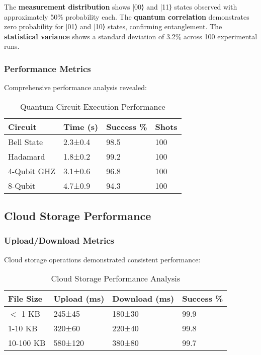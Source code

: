 \documentclass[onecolumn]{IEEEtran}
\begin{document}
The \textbf{measurement distribution} shows |00⟩ and |11⟩ states observed with approximately 50\% probability each. The \textbf{quantum correlation} demonstrates zero probability for |01⟩ and |10⟩ states, confirming entanglement. The \textbf{statistical variance} shows a standard deviation of 3.2\% across 100 experimental runs.

\subsubsection{Performance Metrics}

Comprehensive performance analysis revealed:

\begin{table}[h]
\centering
\caption{Quantum Circuit Execution Performance}
\footnotesize
\begin{tabular}{|p{1.8cm}|p{1.5cm}|p{1.5cm}|p{1cm}|}
\hline
\textbf{Circuit} & \textbf{Time (s)} & \textbf{Success \%} & \textbf{Shots} \\
\hline
Bell State & 2.3±0.4 & 98.5 & 100 \\
Hadamard & 1.8±0.2 & 99.2 & 100 \\
4-Qubit GHZ & 3.1±0.6 & 96.8 & 100 \\
8-Qubit & 4.7±0.9 & 94.3 & 100 \\
\hline
\end{tabular}
\end{table}

\subsection{Cloud Storage Performance}

\subsubsection{Upload/Download Metrics}

Cloud storage operations demonstrated consistent performance:

\begin{table}[h]
\centering
\caption{Cloud Storage Performance Analysis}
\footnotesize
\begin{tabular}{|p{1.5cm}|p{1.8cm}|p{1.8cm}|p{1.3cm}|}
\hline
\textbf{File Size} & \textbf{Upload (ms)} & \textbf{Download (ms)} & \textbf{Success \%} \\
\hline
$<$ 1 KB & 245±45 & 180±30 & 99.9 \\
1-10 KB & 320±60 & 220±40 & 99.8 \\
10-100 KB & 580±120 & 380±80 & 99.7 \\
\hline
\end{tabular}
\end{table}
\end{document}
